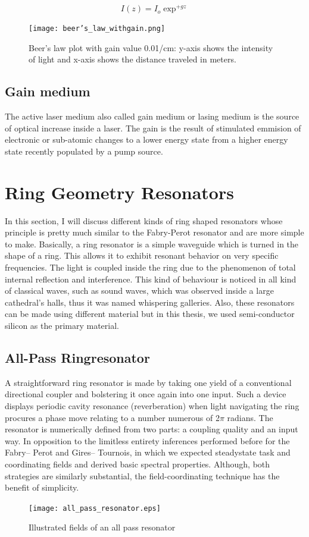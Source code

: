 \begin{equation}
I(z) = I_{o}\exp^{ +g z}
\end{equation}

\begin{figure}[h]
\centering
\texttt{[image: beer's\_law\_withgain.png]}
\caption{Beer's law plot with gain value 0.01/cm: y-axis shows the intensity of light and x-axis shows the distance traveled in meters.}
\end{figure}

\subsection{Gain medium}
The active laser medium also called gain medium or lasing medium is the source of optical increase inside a laser. The gain is the result of stimulated emmision of electronic or sub-atomic changes to a lower energy state from a higher energy state recently populated by a pump source.


\section{Ring Geometry Resonators}
In this section, I will discuss different kinds of ring shaped resonators whose principle is pretty much similar to the Fabry-Perot resonator and are more simple to make. Basically, a ring resonator is a simple waveguide which is turned in the shape of a ring. This allows it to exhibit resonant behavior on very specific frequencies. The light is coupled inside the ring due to the phenomenon of total internal reflection and interference. This kind of behaviour is noticed in all kind of classical waves, such as sound waves, which was observed inside a large cathedral's halls, thus it was named whispering galleries. Also, these resonators can be made using different material but in this thesis, we used semi-conductor silicon as the primary material. 

\subsection{All-Pass Ringresonator}
A straightforward ring resonator is made by taking one yield of a conventional directional coupler and bolstering it once again into one input. Such a device displays periodic cavity resonance (reverberation) when light navigating the ring procures a phase move relating to a number numerous of 2$\pi$ radians. The resonator is numerically defined from two parts: a coupling quality and an input way. In opposition to the limitless entirety inferences performed before for the Fabry– Perot and Gires– Tournois, in which we expected steadystate task and coordinating fields and derived basic spectral properties. Although, both strategies are similarly substantial, the field-coordinating technique has the benefit of simplicity.
\begin{figure}[h]
\centering
\texttt{[image: all\_pass\_resonator.eps]}
\caption{Illustrated fields of an all pass resonator}
\end{figure}


